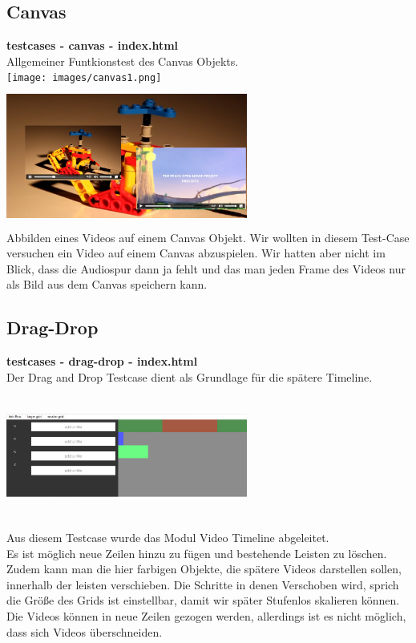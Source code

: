 \documentclass[a4paper,10pt]{scrartcl}
\begin{document}
\subsection{Canvas}
\textbf{testcases - canvas - index.html} \\
Allgemeiner Funtkionstest des Canvas Objekts.\\ 
\texttt{[image: images/canvas1.png]}\\
\includegraphics[height=176px, width=300px]{images/canvas2.png}\\
Abbilden eines Videos auf einem Canvas Objekt. 
Wir wollten in diesem Test-Case versuchen ein Video auf einem Canvas abzuspielen. Wir hatten aber nicht im Blick, dass die Audiospur dann ja fehlt und das man jeden Frame des Videos nur als Bild aus dem Canvas speichern kann.
\subsection{Drag-Drop}
\textbf{testcases - drag-drop - index.html} \\
Der Drag and Drop Testcase dient als Grundlage für die spätere Timeline.\\
\includegraphics[height=176px, width=300px]{images/draganddrop.png}\\
Aus diesem Testcase wurde das Modul Video Timeline abgeleitet.\\
Es ist möglich neue Zeilen hinzu zu fügen und bestehende Leisten zu löschen.\\
Zudem kann man die hier farbigen Objekte, die spätere Videos darstellen sollen, innerhalb der leisten verschieben. Die Schritte in denen Verschoben wird, sprich die Größe des Grids ist einstellbar, damit wir später Stufenlos skalieren können.\\
Die Videos können in neue Zeilen gezogen werden, allerdings ist es nicht möglich, dass sich Videos überschneiden. 
\end{document}
